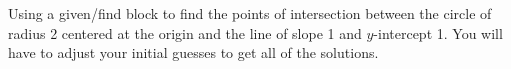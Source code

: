 {Using a given/find block to find the points of intersection between the circle of radius 2 centered at the origin and the line of slope 1 and $y$-intercept 1.  You will have to adjust your initial guesses to get all of the solutions.
}
{}